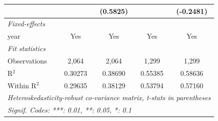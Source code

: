 \begin{tabular}{lcccc}
                     &                & (0.5825)       &                & (-0.2481)\\   
   \midrule
   \emph{Fixed-effects}\\
   year              & Yes            & Yes            & Yes            & Yes\\  
   \midrule
   \emph{Fit statistics}\\
   Observations      & 2,064          & 2,064          & 1,299          & 1,299\\  
   R$^2$             & 0.30273        & 0.38690        & 0.55385        & 0.58636\\  
   Within R$^2$      & 0.29635        & 0.38129        & 0.53794        & 0.57160\\  
   \midrule \midrule
   \multicolumn{5}{l}{\emph{Heteroskedasticity-robust co-variance matrix, t-stats in parentheses}}\\
   \multicolumn{5}{l}{\emph{Signif. Codes: ***: 0.01, **: 0.05, *: 0.1}}\\
\end{tabular}
\par\endgroup


